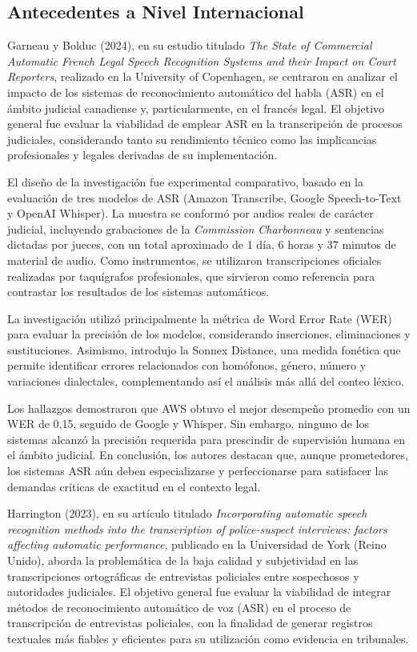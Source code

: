 \documentclass[12pt,a4paper,oneside]{report}
\begin{document}
\subsection{Antecedentes a Nivel Internacional}

Garneau y Bolduc (2024), en su estudio titulado \textit{The State of Commercial Automatic French Legal Speech Recognition Systems and their Impact on Court Reporters}, realizado en la University of Copenhagen, se centraron en analizar el impacto de los sistemas de reconocimiento automático del habla (ASR) en el ámbito judicial canadiense y, particularmente, en el francés legal. El objetivo general fue evaluar la viabilidad de emplear ASR en la transcripción de procesos judiciales, considerando tanto su rendimiento técnico como las implicancias profesionales y legales derivadas de su implementación.

El diseño de la investigación fue experimental comparativo, basado en la evaluación de tres modelos de ASR (Amazon Transcribe, Google Speech-to-Text y OpenAI Whisper). La muestra se conformó por audios reales de carácter judicial, incluyendo grabaciones de la \textit{Commission Charbonneau} y sentencias dictadas por jueces, con un total aproximado de 1 día, 6 horas y 37 minutos de material de audio. Como instrumentos, se utilizaron transcripciones oficiales realizadas por taquígrafos profesionales, que sirvieron como referencia para contrastar los resultados de los sistemas automáticos.

La investigación utilizó principalmente la métrica de Word Error Rate (WER) para evaluar la precisión de los modelos, considerando inserciones, eliminaciones y sustituciones. Asimismo, introdujo la Sonnex Distance, una medida fonética que permite identificar errores relacionados con homófonos, género, número y variaciones dialectales, complementando así el análisis más allá del conteo léxico.

Los hallazgos demostraron que AWS obtuvo el mejor desempeño promedio con un WER de 0,15, seguido de Google y Whisper. Sin embargo, ninguno de los sistemas alcanzó la precisión requerida para prescindir de supervisión humana en el ámbito judicial. En conclusión, los autores destacan que, aunque prometedores, los sistemas ASR aún deben especializarse y perfeccionarse para satisfacer las demandas críticas de exactitud en el contexto legal.

Harrington (2023), en su artículo titulado \textit{Incorporating automatic speech recognition methods into the transcription of police-suspect interviews: factors affecting automatic performance}, publicado en la Universidad de York (Reino Unido), aborda la problemática de la baja calidad y subjetividad en las transcripciones ortográficas de entrevistas policiales entre sospechosos y autoridades judiciales. El objetivo general fue evaluar la viabilidad de integrar métodos de reconocimiento automático de voz (ASR) en el proceso de transcripción de entrevistas policiales, con la finalidad de generar registros textuales más fiables y eficientes para su utilización como evidencia en tribunales.
\end{document}
